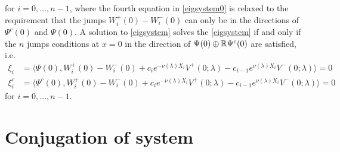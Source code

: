 \documentclass[thesis.tex]{subfiles}
\begin{document}
for $i = 0, \dots, n-1$, where the fourth equation in \cref{eigsystem0} is relaxed to the requirement that the jumps $W_i^+(0) - W_i^-(0)$ can only be in the directions of $\Psi^c(0)$ and $\Psi(0)$. A solution to \eqref{eigsystem} solves the \cref{eigsystem} if and only if the $n$ jumps conditions at $x = 0$ in the direction of $\Psi(0) \oplus \mathbb{R} \Psi^c(0)$ are satisfied, i.e.  
\begin{equation}\label{jumpxi1}
\begin{aligned}
\xi_i &= \langle \Psi(0), W_i^+(0) - W_i^-(0) + c_i e^{-\nu(\lambda)X_i}V^+(0; \lambda) - c_{i-1} e^{\nu(\lambda)X_i} V^-(0; \lambda) \rangle = 0  \\
\xi_i^c &= \langle \Psi^c(0), W_i^+(0) - W_i^-(0) + c_i e^{-\nu(\lambda)X_i}V^+(0; \lambda) - c_{i-1} e^{\nu(\lambda)X_i} V^-(0; \lambda) \rangle = 0 
\end{aligned}
\end{equation}
for $i = 0, \dots, n-1$. 

\section{Conjugation of system}\label{sec:conj}
\end{document}

